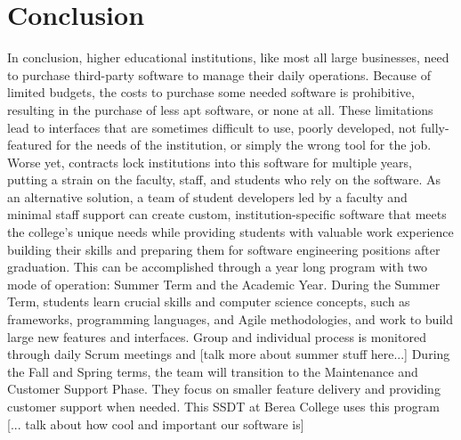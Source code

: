 \section{Conclusion}
In conclusion, higher educational institutions, like most all large businesses, need to purchase third-party software to manage their daily operations. Because of limited budgets, the costs to purchase some needed software is prohibitive, resulting in the purchase of less apt software, or none at all. These limitations lead to interfaces that are sometimes difficult to use, poorly developed, not fully-featured for the needs of the institution, or simply the wrong tool for the job. Worse yet, contracts lock institutions into this software for multiple years, putting a strain on the faculty, staff, and students who rely on the software. As an alternative solution, a team of student developers led by a faculty and minimal staff support can create custom, institution-specific software that meets the college's unique needs while providing students with valuable work experience building their skills and preparing them for software engineering positions after graduation. This can be accomplished through a year long program with two mode of operation: Summer Term and the Academic Year. During the Summer Term, students learn crucial skills and computer science concepts, such as frameworks, programming languages, and Agile methodologies, and work to build large new features and interfaces. Group and individual process is monitored through daily Scrum meetings and [talk more about summer stuff here...] During the Fall and Spring terms, the team will transition to the Maintenance and Customer Support Phase. They focus on smaller feature delivery and providing customer support when needed. This SSDT at Berea College uses this program [... talk about how cool and important our software is]